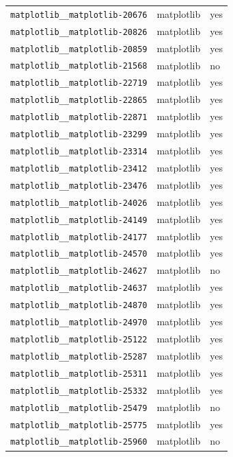 \begin{longtable}{@{}p{}lp{}@{}}
\texttt{matplotlib\_\_matplotlib-20676} & matplotlib & yes \\
\texttt{matplotlib\_\_matplotlib-20826} & matplotlib & yes \\
\texttt{matplotlib\_\_matplotlib-20859} & matplotlib & yes \\
\texttt{matplotlib\_\_matplotlib-21568} & matplotlib & no \\
\texttt{matplotlib\_\_matplotlib-22719} & matplotlib & yes \\
\texttt{matplotlib\_\_matplotlib-22865} & matplotlib & yes \\
\texttt{matplotlib\_\_matplotlib-22871} & matplotlib & yes \\
\texttt{matplotlib\_\_matplotlib-23299} & matplotlib & yes \\
\texttt{matplotlib\_\_matplotlib-23314} & matplotlib & yes \\
\texttt{matplotlib\_\_matplotlib-23412} & matplotlib & yes \\
\texttt{matplotlib\_\_matplotlib-23476} & matplotlib & yes \\
\texttt{matplotlib\_\_matplotlib-24026} & matplotlib & yes \\
\texttt{matplotlib\_\_matplotlib-24149} & matplotlib & yes \\
\texttt{matplotlib\_\_matplotlib-24177} & matplotlib & yes \\
\texttt{matplotlib\_\_matplotlib-24570} & matplotlib & yes \\
\texttt{matplotlib\_\_matplotlib-24627} & matplotlib & no \\
\texttt{matplotlib\_\_matplotlib-24637} & matplotlib & yes \\
\texttt{matplotlib\_\_matplotlib-24870} & matplotlib & yes \\
\texttt{matplotlib\_\_matplotlib-24970} & matplotlib & yes \\
\texttt{matplotlib\_\_matplotlib-25122} & matplotlib & yes \\
\texttt{matplotlib\_\_matplotlib-25287} & matplotlib & yes \\
\texttt{matplotlib\_\_matplotlib-25311} & matplotlib & yes \\
\texttt{matplotlib\_\_matplotlib-25332} & matplotlib & yes \\
\texttt{matplotlib\_\_matplotlib-25479} & matplotlib & no \\
\texttt{matplotlib\_\_matplotlib-25775} & matplotlib & yes \\
\texttt{matplotlib\_\_matplotlib-25960} & matplotlib & no \\

\end{longtable}
